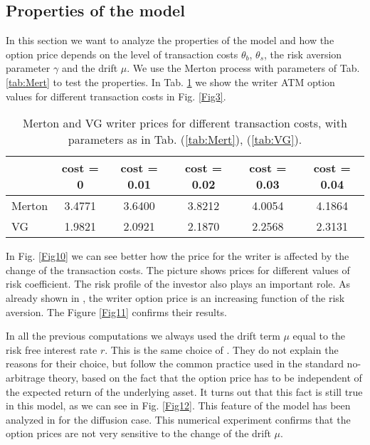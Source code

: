 \subsection{Properties of the model}\label{model_properties}

In this section we want to analyze the properties of the model and how the option price depends on the level of transaction costs $\theta_b$, $\theta_s$, 
the risk aversion parameter $\gamma$ and the drift $\mu$. 
We use the Merton process with parameters of Tab. \ref{tab:Mert} to test the properties.
In Tab. \ref{tab:costs} we show the writer ATM option values for different transaction costs in Fig. \ref{Fig3}.  
\begin{table}[h!]
\begin{center}
 \begin{minipage}{\linewidth}
  \centering
 \begin{tabular}{||l||c|c|c|c|c||}
\hline
 & cost = 0 & cost = 0.01 & cost = 0.02 & cost = 0.03 & cost = 0.04  \\
\hline
Merton & 3.4771 & 3.6400 & 3.8212 & 4.0054 & 4.1864 \\
\hline
VG & 1.9821 & 2.0921 & 2.1870 & 2.2568 & 2.3131 \\
\hline
\end{tabular}
  \caption{Merton and VG writer prices for different transaction costs, with parameters as in Tab. (\ref{tab:Mert}), (\ref{tab:VG}). }
  \label{tab:costs}
\end{minipage}
  \end{center}
\end{table}
In Fig. \ref{Fig10} we can see better how the price for the writer is affected by the change of the transaction costs. 
The picture shows prices for different values of risk coefficient.
The risk profile of the investor also plays an important role. As already shown in \cite{HoNe89}, the writer option price is an
increasing function of the risk aversion. 
The Figure \ref{Fig11} confirms their results.

In all the previous computations we always used the drift term $\mu$ equal to the risk free interest rate $r$. This is the same choice  
of \cite{HoNe89}. They do not explain the reasons for their choice, but follow the common practice used in the standard no-arbitrage
theory, based on the fact that
the option price has to be independent of the expected return of the underlying asset.
It turns out that this fact is still true in this model, as we can see in Fig. \ref{Fig12}. This feature
of the model has been analyzed in \cite{Damgaard} for the diffusion case. This numerical experiment confirms that the option prices 
are not very sensitive to the change of the drift $\mu$.

